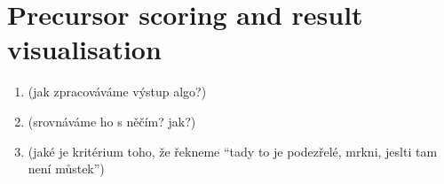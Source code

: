 \section{Precursor scoring and result visualisation}

\begin{enumerate}
	\item (jak zpracováváme výstup algo?)
	\item (srovnáváme ho s něčím? jak?)
	\item (jaké je kritérium toho, že řekneme ``tady to je podezřelé, mrkni, jeslti tam není můstek'')
\end{enumerate}







